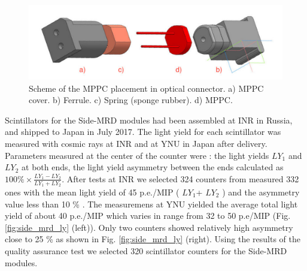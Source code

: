 \begin{figure}[tbh]
\begin{center}
\includegraphics[width=0.8\linewidth]{fig/side_mrd_optical_scheme.pdf}
\end{center}
\caption{
Scheme of the MPPC placement in optical connector.  a) MPPC cover. b) Ferrule. c) Spring (sponge rubber). d) MPPC.
}
\label{fig:side_mrd_optical_scheme}
\end{figure}

Scintillators for the Side-MRD modules had been assembled at INR in Russia, and shipped to Japan in July 2017. The light yield for each scintillator was measured with cosmic rays at INR and at YNU in Japan after delivery.  Parameters measured at the center of the counter were : the light yields  $LY_{1}$ and $LY_{2}$ at both ends, the light yield asymmetry between the ends calculated as $100\% \times \frac{LY_{1}-LY_{2}}{LY_{1}+LY_{2}}$.
After tests at INR we selected 324 counters from measured 332 ones with the mean light yield of 45 p.e./MIP ( $LY_{1}$+ $LY_{2}$ ) and the asymmetry value less than 10 \% . 
The measuremens at YNU yielded the average total light yield of about 40 p.e./MIP which varies in range  from 32 to 50 p.e/MIP  (Fig. \ref{fig:side_mrd_ly} (left)). Only two counters  showed relatively high asymmetry close to 25 \% as shown in Fig. \ref{fig:side_mrd_ly} (right). 
Using the results of the quality assurance test  we selected 320 scintillator counters for the Side-MRD modules. 

